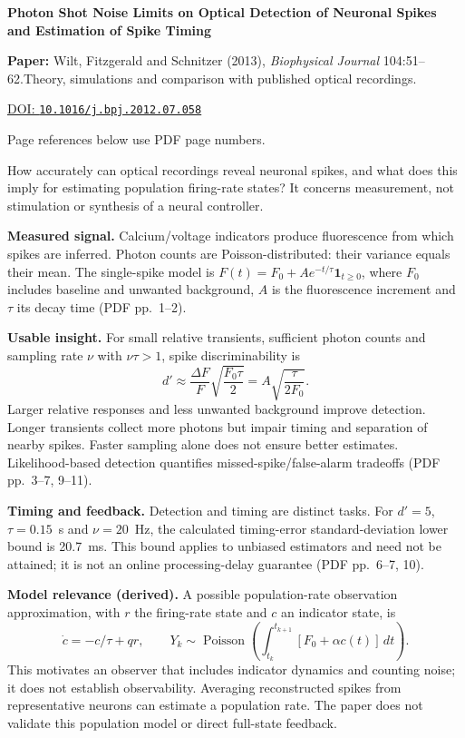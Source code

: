 

{\Large\bfseries Photon Shot Noise Limits on Optical Detection of Neuronal Spikes and Estimation of Spike Timing\par}

\textbf{Paper:} Wilt, Fitzgerald and Schnitzer (2013),
\emph{Biophysical Journal} 104:51--62.\quad Theory, simulations and
comparison with published optical recordings.\par
\href{https://doi.org/10.1016/j.bpj.2012.07.058}{DOI: \nolinkurl{10.1016/j.bpj.2012.07.058}}\par
{\footnotesize Page references below use PDF page numbers.}

How accurately can optical recordings reveal neuronal spikes, and what
does this imply for estimating population firing-rate states? It concerns
measurement, not stimulation or synthesis of a neural controller.

\textbf{Measured signal.} Calcium/voltage indicators produce fluorescence
from which spikes are inferred. Photon counts are Poisson-distributed:
their variance equals their mean. The single-spike model is
$F(t)=F_0+A e^{-t/\tau}\mathbf1_{t\ge0}$, where $F_0$ includes baseline
and unwanted background, $A$ is the fluorescence increment and $\tau$
its decay time (PDF pp.~1--2).

\textbf{Usable insight.} For small relative transients, sufficient photon
counts and sampling rate $\nu$ with $\nu\tau>1$, spike discriminability is
\[
 d'\approx\frac{\Delta F}{F}\sqrt{\frac{F_0\tau}{2}}
       =A\sqrt{\frac{\tau}{2F_0}}.
\]
Larger relative responses and less unwanted background improve detection.
Longer transients collect more photons but impair timing and separation
of nearby spikes. Faster sampling alone does not ensure better estimates.
Likelihood-based detection quantifies missed-spike/false-alarm tradeoffs
(PDF pp.~3--7, 9--11).

\textbf{Timing and feedback.} Detection and timing are distinct tasks.
For $d'=5$, $\tau=0.15$~s and $\nu=20$~Hz, the calculated timing-error
standard-deviation lower bound is 20.7~ms. This bound applies to unbiased
estimators and need not be attained; it is not an online processing-delay
guarantee (PDF pp.~6--7, 10).

\textbf{Model relevance (derived).} A possible population-rate observation
approximation, with $r$ the firing-rate state and $c$ an indicator state, is
\[
 \dot c=-c/\tau+q r,\qquad
 Y_k\sim\operatorname{Poisson}\!\left(
   \int_{t_k}^{t_{k+1}}[F_0+\alpha c(t)]\,dt\right).
\]
This motivates an observer that includes indicator dynamics and counting
noise; it does not establish observability. Averaging reconstructed spikes
from representative neurons can estimate a population rate. The paper
does not validate this population model or direct full-state feedback.

